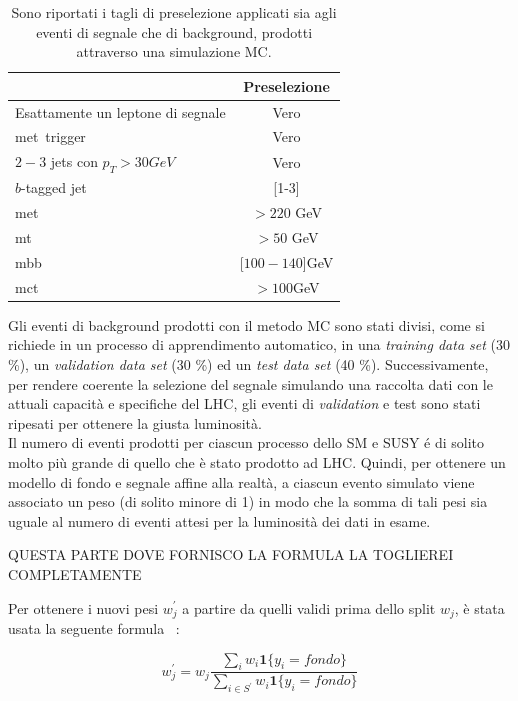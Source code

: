 \begin{table}[h!]
	\centering
	\begin{tabular}{lc}
		\hline
		&Preselezione \\
		\hline
		Esattamente un leptone di segnale&Vero\\
		met\ trigger&Vero\\
		$2-3$ jets con $p_{T}>30 GeV$&Vero\\
		$b$-tagged jet&[1-3]\\
		met\ &$> 220$ GeV\\
		mt\ &$> 50$ GeV\\
		mbb\ &[$100-140$]GeV\\
		mct\ &$>100$GeV\\
		\hline
	\end{tabular}
	\caption{Sono riportati i tagli di preselezione applicati sia agli eventi di segnale che di background, prodotti attraverso una simulazione MC.}
	\label{tab:tagli di preselezione}
\end{table} 
Gli eventi di background prodotti con il metodo MC sono stati divisi, come si richiede in un processo di apprendimento automatico, in una \textit{training data set} (30 \%), un \textit{validation data set} (30 \%) ed un \textit{test data set} (40 \%). Successivamente, per rendere coerente la selezione del segnale simulando una raccolta dati con le attuali capacità e specifiche del LHC, gli eventi di \textit{validation} e test sono stati ripesati per ottenere la giusta luminosità.\\
Il numero di eventi prodotti per ciascun processo dello SM e SUSY é di solito molto più grande di quello che è stato prodotto ad LHC. Quindi, per ottenere un modello di fondo e segnale affine alla realtà, a ciascun evento simulato viene associato un peso (di solito minore di 1) in modo che la somma di tali pesi sia uguale al numero di eventi attesi per la luminosità dei dati in esame.

\color{red}

QUESTA PARTE DOVE FORNISCO LA FORMULA LA TOGLIEREI COMPLETAMENTE

Per ottenere i nuovi pesi $w_{j}^{'}$ a partire da quelli validi prima dello split $w_{j}$, è stata usata la seguente formula ~\cite{HiggsChalllenge}:

\begin{equation}
	\label{eq:ripesaggio}
    w_j^{'}=  w_{j}\frac{\sum_{i} w_{i} \textbf{1} \lbrace y_{i}=fondo\rbrace }{\sum_{i\in S^{'}}w_{i} \textbf{1} \lbrace y_{i}=fondo\rbrace }  
\end{equation}

